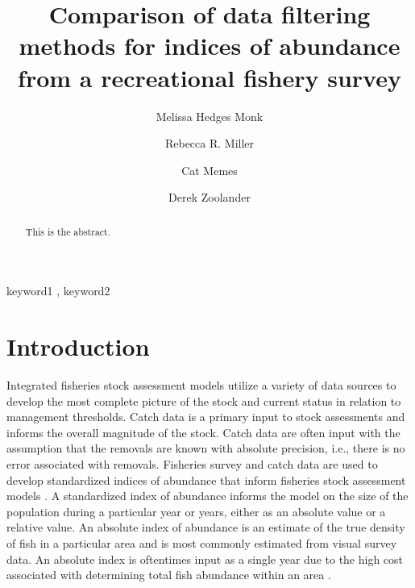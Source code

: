 \documentclass[
  authoryear,
  preprint,
  3p]{elsarticle}
\begin{document}
\begin{frontmatter}
\title{Comparison of data filtering methods for indices of abundance
from a recreational fishery survey}
\author[1]{Melissa Hedges Monk%
%
}
\author[2]{Rebecca R. Miller%
%
}
\author[2]{Cat Memes%
%
}
\author[]{Derek Zoolander%
%
}





        
\begin{abstract}
This is the abstract.
\end{abstract}





\begin{keyword}
    keyword1 \sep 
    keyword2
\end{keyword}
\end{frontmatter}\ifdefined\Shaded\renewenvironment{Shaded}{\begin{tcolorbox}[interior hidden, sharp corners, frame hidden, borderline west={3pt}{0pt}{shadecolor}, boxrule=0pt, breakable, enhanced]}{\end{tcolorbox}}\fi

\hypertarget{introduction}{%
\section{Introduction}\label{introduction}}

Integrated fisheries stock assessment models utilize a variety of data
sources to develop the most complete picture of the stock and current
status in relation to management thresholds. Catch data is a primary
input to stock assessments and informs the overall magnitude of the
stock. Catch data are often input with the assumption that the removals
are known with absolute precision, i.e., there is no error associated
with removals. Fisheries survey and catch data are used to develop
standardized indices of abundance that inform fisheries stock assessment
models \citep{Maunder:2004:SCE}. A standardized index of abundance
informs the model on the size of the population during a particular year
or years, either as an absolute value or a relative value. An absolute
index of abundance is an estimate of the true density of fish in a
particular area and is most commonly estimated from visual survey data.
An absolute index is oftentimes input as a single year due to the high
cost associated with determining total fish abundance within an area
\citep{Love:2009:DFA}.
\end{document}
